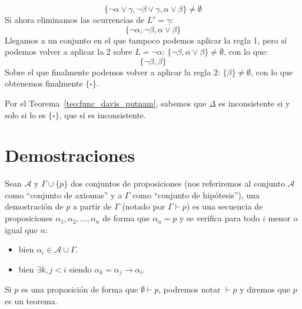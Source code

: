 \begin{ejemplo}
\begin{enumerate}
            \begin{equation*}
                \{\lnot\alpha\lor\gamma,\lnot\beta\lor\gamma,\alpha\lor\beta\} \neq \emptyset 
            \end{equation*}
            Si ahora eliminamos las ocurrencias de $L^c=\gamma$:
            \begin{equation*}
                \{\lnot\alpha,\lnot\beta,\alpha\lor\beta\}
            \end{equation*}
            Llegamos a un conjunto en el que tampoco podemos aplicar la regla 1, pero sí podemos volver a aplicar la 2 sobre $L=\lnot\alpha$: $\{\lnot\beta,\alpha\lor\beta\}\neq \emptyset $, con lo que:
            \begin{equation*}
                \{\lnot\beta,\beta\}
            \end{equation*}
            Sobre el que finalmente podemos volver a aplicar la regla 2: $\{\beta\}\neq \emptyset $, con lo que obtenemos finalmente $\{\square\}$.

            Por el Teorema~\ref{teo:func_davis_putnam}, sabemos que $\Delta$ es inconsistente si y solo si lo es $\{\square\}$, que sí es inconsistente.
    \end{enumerate}
\end{ejemplo}

\section{Demostraciones}
\begin{definicion}[Demostración]
    Sean $\mathcal{A}$ y $\Gamma\cup\{p\}$ dos conjuntos de proposiciones (nos referiremos al conjunto $\mathcal{A}$ como ``conjunto de axiomas'' y a $\Gamma$ como ``conjunto de hipótesis''), una demostración de $p$ a partir de $\Gamma$ (notado por $\Gamma\vdash p$) es una secuencia de proposiciones $\alpha_1,\alpha_2,\ldots,\alpha_n$ de forma que $\alpha_n=p$ y se verifica para todo $i$ menor o igual que $n$:
    \begin{itemize}
        \item bien $\alpha_i \in \mathcal{A}\cup\Gamma$.
        \item bien $\exists k,j<i$ siendo $\alpha_k = \alpha_j\to \alpha_i$.
    \end{itemize}
\end{definicion}

\begin{notacion}
    Si $p$ es una proposición de forma que $\emptyset \vdash p$, podremos notar $\vdash p$ y diremos que $p$ es un teorema.
\end{notacion}

